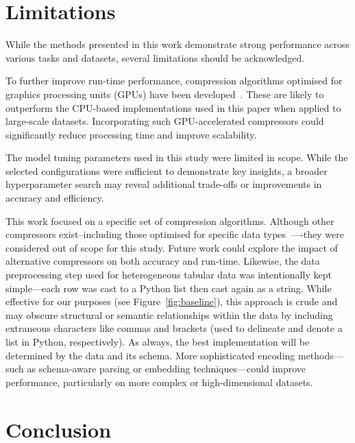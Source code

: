\documentclass[preprint,12pt]{article}
\begin{document}
\section{Limitations}
\label{limitations}
While the methods presented in this work demonstrate strong performance across various tasks and datasets, several limitations should be acknowledged.

To further improve run-time performance, compression algorithms optimised for graphics processing units (GPUs) have been developed~\cite{gpu_compression}.
These are likely to outperform the CPU-based implementations used in this paper when applied to large-scale datasets.
Incorporating such GPU-accelerated compressors could significantly reduce processing time and improve scalability.

The model tuning parameters used in this study were limited in scope.
While the selected configurations were sufficient to demonstrate key insights, a broader hyperparameter search may reveal additional trade-offs or improvements in accuracy and efficiency.

This work focused on a specific set of compression algorithms.
Although other compressors exist--including those optimised for specific data types~\cite{gpu_compression,mp3,hevc}—-they were considered out of scope for this study.
Future work could explore the impact of alternative compressors on both accuracy and run-time.
Likewise, the data preprocessing step used for heterogeneous tabular data was intentionally kept simple---each row was cast to a Python list then cast again as a string. 
While effective for our purposes (see Figure~\ref{fig:baseline}), this approach is crude and may obscure structural or semantic relationships within the data by including extraneous characters like commas and brackets (used to delineate and denote a list in Python, respectively).
As always, the best implementation will be determined by the data and its schema.
More sophisticated encoding methods—such as schema-aware parsing or embedding techniques—could improve performance, particularly on more complex or high-dimensional datasets.




\section{Conclusion}
\label{conclusion}
\end{document}
